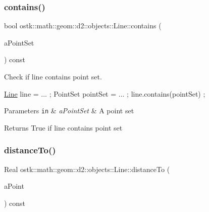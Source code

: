 \subsubsection{\texorpdfstring{contains()}{contains()}\hspace{0.1cm}{\footnotesize\ttfamily [2/2]}}
{\footnotesize\ttfamily bool ostk\+::math\+::geom\+::d2\+::objects\+::\+Line\+::contains (\begin{DoxyParamCaption}\item[{const \hyperlink{classostk_1_1math_1_1geom_1_1d2_1_1objects_1_1_point_set}{Point\+Set} \&}]{a\+Point\+Set }\end{DoxyParamCaption}) const}



Check if line contains point set. 


\begin{DoxyCode}
\hyperlink{classostk_1_1math_1_1geom_1_1d2_1_1objects_1_1_line_aa1570ebec4d4f57cbed3c188e6b65613}{Line} line = ... ;
PointSet pointSet = ... ;
line.contains(pointSet) ;
\end{DoxyCode}



\begin{DoxyParams}[1]{Parameters}
\mbox{\tt in}  & {\em a\+Point\+Set} & A point set \\
\hline
\end{DoxyParams}
\begin{DoxyReturn}{Returns}
True if line contains point set 
\end{DoxyReturn}
\mbox{\label{classostk_1_1math_1_1geom_1_1d2_1_1objects_1_1_line_a70baa8b6dcab704385e54c4086343d57}} 
\subsubsection{\texorpdfstring{distance\+To()}{distanceTo()}}
{\footnotesize\ttfamily Real ostk\+::math\+::geom\+::d2\+::objects\+::\+Line\+::distance\+To (\begin{DoxyParamCaption}\item[{const \hyperlink{classostk_1_1math_1_1geom_1_1d2_1_1objects_1_1_point}{Point} \&}]{a\+Point }\end{DoxyParamCaption}) const}



